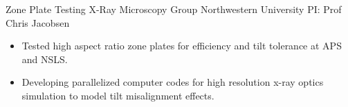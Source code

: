 

        {Zone Plate Testing}
        {X-Ray Microscopy Group}
        {Northwestern University}
        {PI: Prof Chris Jacobsen}{
    \begin{itemize}
		\item Tested high aspect ratio zone plates for efficiency and tilt tolerance at APS and NSLS.
		\item Developing parallelized computer codes for high resolution x-ray optics simulation to model tilt misalignment effects.
    \end{itemize}
	}

